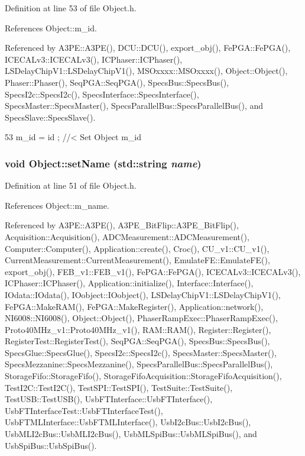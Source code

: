 Definition at line 53 of file Object.h.

References Object::m\_\-id.

Referenced by A3PE::A3PE(), DCU::DCU(), export\_\-obj(), FePGA::FePGA(), ICECALv3::ICECALv3(), ICPhaser::ICPhaser(), LSDelayChipV1::LSDelayChipV1(), MSOxxxx::MSOxxxx(), Object::Object(), Phaser::Phaser(), SeqPGA::SeqPGA(), SpecsBus::SpecsBus(), SpecsI2c::SpecsI2c(), SpecsInterface::SpecsInterface(), SpecsMaster::SpecsMaster(), SpecsParallelBus::SpecsParallelBus(), and SpecsSlave::SpecsSlave().


\begin{DoxyCode}
53 { m_id    = id    ; } //< Set Object m_id
\end{DoxyCode}
\hypertarget{classObject_ae30fea75683c2d149b6b6d17c09ecd0c}{
\subsubsection[{setName}]{\setlength{\rightskip}{0pt plus 5cm}void Object::setName (std::string {\em name})}}
\label{classObject_ae30fea75683c2d149b6b6d17c09ecd0c}


Definition at line 51 of file Object.h.

References Object::m\_\-name.

Referenced by A3PE::A3PE(), A3PE\_\-BitFlip::A3PE\_\-BitFlip(), Acquisition::Acquisition(), ADCMeasurement::ADCMeasurement(), Computer::Computer(), Application::create(), Croc(), CU\_\-v1::CU\_\-v1(), CurrentMeasurement::CurrentMeasurement(), EmulateFE::EmulateFE(), export\_\-obj(), FEB\_\-v1::FEB\_\-v1(), FePGA::FePGA(), ICECALv3::ICECALv3(), ICPhaser::ICPhaser(), Application::initialize(), Interface::Interface(), IOdata::IOdata(), IOobject::IOobject(), LSDelayChipV1::LSDelayChipV1(), FePGA::MakeRAM(), FePGA::MakeRegister(), Application::network(), NI6008::NI6008(), Object::Object(), PhaserRampExec::PhaserRampExec(), Proto40MHz\_\-v1::Proto40MHz\_\-v1(), RAM::RAM(), Register::Register(), RegisterTest::RegisterTest(), SeqPGA::SeqPGA(), SpecsBus::SpecsBus(), SpecsGlue::SpecsGlue(), SpecsI2c::SpecsI2c(), SpecsMaster::SpecsMaster(), SpecsMezzanine::SpecsMezzanine(), SpecsParallelBus::SpecsParallelBus(), StorageFifo::StorageFifo(), StorageFifoAcquisition::StorageFifoAcquisition(), TestI2C::TestI2C(), TestSPI::TestSPI(), TestSuite::TestSuite(), TestUSB::TestUSB(), UsbFTInterface::UsbFTInterface(), UsbFTInterfaceTest::UsbFTInterfaceTest(), UsbFTMLInterface::UsbFTMLInterface(), UsbI2cBus::UsbI2cBus(), UsbMLI2cBus::UsbMLI2cBus(), UsbMLSpiBus::UsbMLSpiBus(), and UsbSpiBus::UsbSpiBus().


